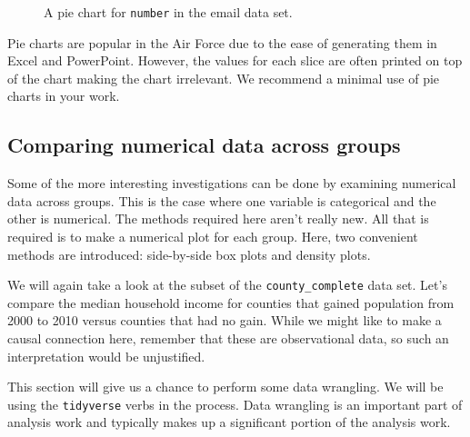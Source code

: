 \documentclass[
  letterpaper,
  DIV=11,
  numbers=noendperiod]{scrreprt}
\begin{document}
\begin{figure}[H]


\caption{\label{fig-pie61}A pie chart for \texttt{number} in the email
data set.}

\end{figure}%

Pie charts are popular in the Air Force due to the ease of generating
them in Excel and PowerPoint. However, the values for each slice are
often printed on top of the chart making the chart irrelevant. We
recommend a minimal use of pie charts in your work.

\subsection{Comparing numerical data across
groups}\label{comparing-numerical-data-across-groups}

Some of the more interesting investigations can be done by examining
numerical data across groups. This is the case where one variable is
categorical and the other is numerical. The methods required here aren't
really new. All that is required is to make a numerical plot for each
group. Here, two convenient methods are introduced: side-by-side box
plots and density plots.

We will again take a look at the subset of the \texttt{county\_complete}
data set. Let's compare the median household income for counties that
gained population from 2000 to 2010 versus counties that had no gain.
While we might like to make a causal connection here, remember that
these are observational data, so such an interpretation would be
unjustified.

This section will give us a chance to perform some data wrangling. We
will be using the \texttt{tidyverse} verbs in the process. Data
wrangling is an important part of analysis work and typically makes up a
significant portion of the analysis work.
\end{document}
